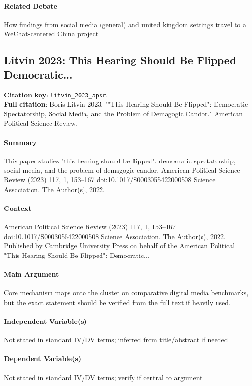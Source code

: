 \documentclass[12pt]{article}
\begin{document}
\paragraph{Related Debate} How findings from social media (general) and united kingdom settings travel to a WeChat-centered China project


\subsection{Litvin 2023: This Hearing Should Be Flipped Democratic...}
\textbf{Citation key}: \texttt{litvin\_2023\_apsr}.\\
\textbf{Full citation}: Boris Litvin 2023. ""This Hearing Should Be Flipped": Democratic Spectatorship, Social Media, and the Problem of Demagogic Candor." American Political Science Review.

\paragraph{Summary} This paper studies "this hearing should be flipped": democratic spectatorship, social media, and the problem of demagogic candor. American Political Science Review (2023) 117, 1, 153--167 doi:10.1017/S0003055422000508 Science Association.  The Author(s), 2022.

\paragraph{Context} American Political Science Review (2023) 117, 1, 153--167 doi:10.1017/S0003055422000508 Science Association.  The Author(s), 2022. Published by Cambridge University Press on behalf of the American Political "This Hearing Should Be Flipped": Democratic...

\paragraph{Main Argument} Core mechanism maps onto the cluster on comparative digital media benchmarks, but the exact statement should be verified from the full text if heavily used.

\paragraph{Independent Variable(s)} Not stated in standard IV/DV terms; inferred from title/abstract if needed

\paragraph{Dependent Variable(s)} Not stated in standard IV/DV terms; verify if central to argument
\end{document}

